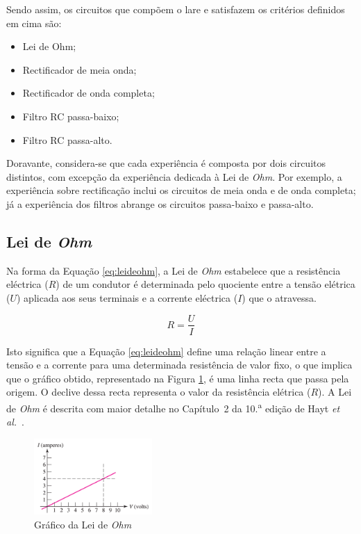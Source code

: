 Sendo assim, os circuitos que compõem o \acrshort{lare} e satisfazem os critérios definidos em cima são:
\begin{itemize}
    \item Lei de Ohm;
    \item Rectificador de meia onda;
    \item Rectificador de onda completa;
    \item Filtro RC passa-baixo;
    \item Filtro RC passa-alto.
\end{itemize}

Doravante, considera-se que cada experiência é composta por dois circuitos distintos, com excepção da experiência dedicada à Lei de \textit{Ohm}. Por exemplo, a experiência sobre rectificação inclui os circuitos de meia onda e de onda completa; já a experiência dos filtros abrange os circuitos passa-baixo e passa-alto.

\subsection{Lei de \textit{Ohm}}
Na forma da Equação \ref{eq:leideohm}, a Lei de \textit{Ohm} estabelece que a resistência eléctrica ($R$) de um condutor é determinada pelo quociente entre a tensão elétrica ($U$) aplicada aos seus terminais e a corrente eléctrica ($I$) que o atravessa.  

\begin{equation} \label{eq:leideohm}
	R=\dfrac{U}{I}
\end{equation}

Isto significa que a Equação \ref{eq:leideohm} define uma relação linear entre a tensão e a corrente para uma determinada resistência de valor fixo, o que implica que o gráfico obtido, representado na Figura \ref{fig:graphohm}, é uma linha recta que passa pela origem. O declive dessa recta representa o valor da resistência elétrica ($R$). A Lei de \textit{Ohm} é descrita com maior detalhe no Capítulo~2 da 10.\textsuperscript{a} edição de Hayt \textit{et al.}~\cite{hayt}.

\begin{figure}[hbtp]
	\centering
	\includegraphics[width=0.4\textwidth]{figures/grafico_Ohm.png}
	\caption{Gráfico da Lei de \textit{Ohm}\cite{hayt}}
	\label{fig:graphohm}
\end{figure}

